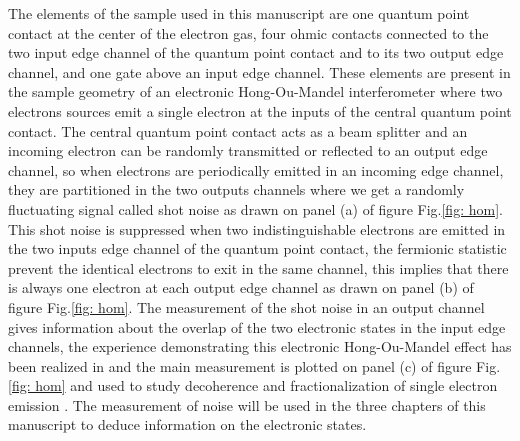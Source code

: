 The elements of the sample used in this manuscript are one quantum point contact at the center of the electron gas, four ohmic contacts connected to the two input edge channel of the quantum point contact and to its two output edge channel, and one gate above an input edge channel.
These elements are present in the sample geometry of an electronic Hong-Ou-Mandel interferometer where two electrons sources emit a single electron at the inputs of the central quantum point contact. 
The central quantum point contact acts as a beam splitter and an incoming electron can be randomly transmitted or reflected to an output edge channel, so when electrons are periodically emitted in an incoming edge channel, they are partitioned in the two outputs channels where we get a randomly fluctuating signal called shot noise as drawn on panel (a) of figure Fig.\ref{fig: hom}.
This shot noise is suppressed when two indistinguishable electrons are emitted in the two inputs edge channel of the quantum point contact, the fermionic statistic prevent the identical electrons to exit in the same channel, this implies that there is always one electron at each output edge channel as drawn on panel (b) of figure Fig.\ref{fig: hom}.
The measurement of the shot noise in an output channel gives information about the overlap of the two electronic states in the input edge channels, the experience demonstrating this electronic Hong-Ou-Mandel effect has been realized in \cite{bocquillon2013} and the main measurement is plotted on panel (c) of figure Fig.\ref{fig: hom} and used to study decoherence and fractionalization of single electron emission \cite{marguerite2016decoherence}.
The measurement of noise will be used in the three chapters of this manuscript to deduce information on the electronic states.
